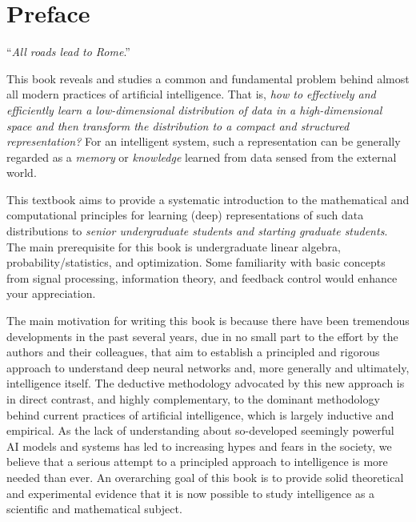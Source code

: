 \documentclass[../../book-main.tex]{subfiles}
\begin{document}
\chapter*{Preface}

\begin{center}
``{\em All roads lead to Rome}.''

\end{center}
\vspace{5mm}

This book reveals and studies a common and fundamental problem behind almost all modern practices of artificial intelligence. That is, {\em how to effectively and efficiently learn a low-dimensional distribution of data in a high-dimensional space and then transform the distribution to a compact and structured representation?} For an intelligent system, such a representation can be generally regarded as a {\em memory} or {\em knowledge} learned from data sensed from the external world. 

This textbook aims to provide a systematic introduction to the mathematical and computational principles for learning (deep) representations of such data distributions to {\em senior undergraduate students and starting graduate students}. The main prerequisite for this book is undergraduate linear algebra, probability/statistics, and optimization. Some familiarity with basic concepts from signal processing, information theory, and feedback control would enhance your appreciation. 

The main motivation for writing this book is because there have been tremendous developments in the past several years, due in no small part to the effort by the authors and their colleagues, that aim to establish a principled and rigorous approach to understand deep neural networks and, more generally and ultimately, intelligence itself. The deductive methodology advocated by this new approach is in direct contrast, and highly complementary, to the dominant methodology behind current practices of artificial intelligence, which is largely inductive and empirical. As the lack of understanding about so-developed seemingly powerful AI models and systems has led to increasing hypes and fears in the society, we believe that a serious attempt to a principled  approach to intelligence is more needed than ever. An overarching goal of this book is to provide solid theoretical and experimental evidence that it is now possible to study intelligence as a scientific and mathematical subject. 
\end{document}
